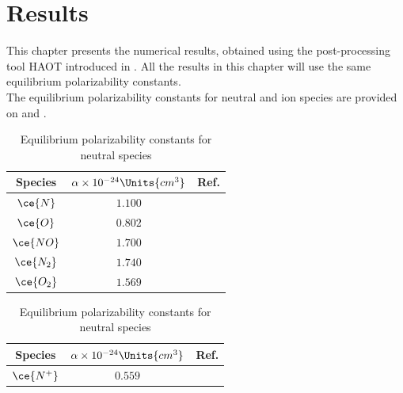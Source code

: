 \chapter{Results\label{ch:ch5}} 

This chapter presents the numerical results, obtained using the post-processing
tool \gls{HAOT} introduced in . All the results in
this chapter will use the same equilibrium polarizability constants. \\

The equilibrium polarizability constants for neutral and ion species are
provided on  and
.
       \begin{table}[H]
           \begin{minipage}[b]{0.49\textwidth}
            \centering
                \begin{tabular}{| c | c | c |}
                    \hline 
                    Species  & $\alpha \times 10^{-24}\Units{cm^3}$ & Ref.             \\
                    \hline \hline 
                    $\ce{N}$        & $1.100$                               &\cite{Haynes2004}\\
                    $\ce{O}$        & $0.802$                               &\cite{Haynes2004}\\
                    $\ce{NO}$       & $1.700$                               &\cite{Haynes2004}\\
                    $\ce{N_2}$      & $1.740$                               &\cite{Haynes2004}\\
                    $\ce{O_2}$      & $1.569$                               &\cite{Haynes2004}\\
                    \hline 
                \end{tabular} 
            \caption{Equilibrium polarizability constants for neutral species\label{tab:equilibriumPolarizabilityNeutralSpecies}}
            \end{minipage} \hfill
           \begin{minipage}[b]{0.49\textwidth}
               \centering
                \begin{tabular}{| c | c | c |}
                    \hline
                    Species  & $\alpha \times 10^{-24}\Units{cm^3}$ & Ref.             \\
                    \hline\hline
                    $\ce{N^+}$   & $0.559$                               &\cite{Jacobson1996}\\

\end{tabular}
\end{minipage}
\end{table}
